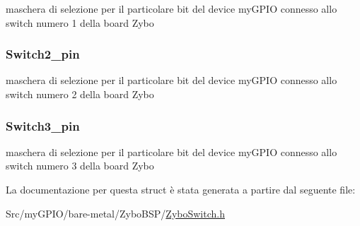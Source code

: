 maschera di selezione per il particolare bit del device my\+G\+P\+I\+O connesso allo switch numero 1 della board Zybo \hypertarget{struct_zybo_switch__t_aacdefa991c974546015032b1bb95ea1e}{
\subsubsection[{Switch2\+\_\+pin}]{ Switch2\+\_\+pin}}\label{struct_zybo_switch__t_aacdefa991c974546015032b1bb95ea1e}
maschera di selezione per il particolare bit del device my\+G\+P\+I\+O connesso allo switch numero 2 della board Zybo \hypertarget{struct_zybo_switch__t_ab2ea73dda75022931396b29e1c377cfb}{
\subsubsection[{Switch3\+\_\+pin}]{ Switch3\+\_\+pin}}\label{struct_zybo_switch__t_ab2ea73dda75022931396b29e1c377cfb}
maschera di selezione per il particolare bit del device my\+G\+P\+I\+O connesso allo switch numero 3 della board Zybo 

La documentazione per questa struct è stata generata a partire dal seguente file\+:\begin{DoxyCompactItemize}
\item 
Src/my\+G\+P\+I\+O/bare-\/metal/\+Zybo\+B\+S\+P/\hyperlink{_zybo_switch_8h}{Zybo\+Switch.\+h}\end{DoxyCompactItemize}
